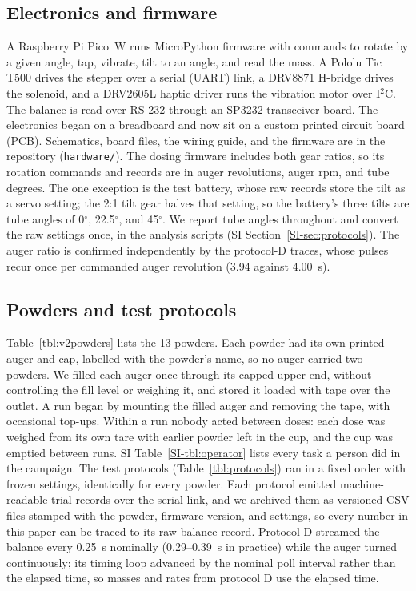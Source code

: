 \documentclass[twoside,twocolumn,9pt]{article}
\newcommand{\siref}[1]{\ref*{SI-#1}}
\begin{document}
\subsection{Electronics and firmware}
A Raspberry Pi Pico~W runs MicroPython firmware with commands to rotate by a given angle, tap, vibrate, tilt to an angle, and read the mass. A Pololu Tic T500 drives the stepper over a serial (UART) link, a DRV8871 H-bridge drives the solenoid, and a DRV2605L haptic driver runs the vibration motor over I$^2$C. The balance is read over RS-232 through an SP3232 transceiver board. The electronics began on a breadboard and now sit on a custom printed circuit board (PCB). Schematics, board files, the wiring guide, and the firmware are in the repository (\texttt{hardware/}). The dosing firmware includes both gear ratios, so its rotation commands and records are in auger revolutions, auger rpm, and tube degrees. The one exception is the test battery, whose raw records store the tilt as a servo setting; the 2:1 tilt gear halves that setting, so the battery's three tilts are tube angles of 0$^\circ$, 22.5$^\circ$, and 45$^\circ$. We report tube angles throughout and convert the raw settings once, in the analysis scripts (SI Section~\siref{sec:protocols}). The auger ratio is confirmed independently by the protocol-D traces, whose pulses recur once per commanded auger revolution (3.94 against 4.00~s).

\subsection{Powders and test protocols}
Table~\ref{tbl:v2powders} lists the 13 powders. Each powder had its own printed auger and cap, labelled with the powder's name, so no auger carried two powders. We filled each auger once through its capped upper end, without controlling the fill level or weighing it, and stored it loaded with tape over the outlet. A run began by mounting the filled auger and removing the tape, with occasional top-ups. Within a run nobody acted between doses: each dose was weighed from its own tare with earlier powder left in the cup, and the cup was emptied between runs. SI Table~\siref{tbl:operator} lists every task a person did in the campaign. The test protocols (Table~\ref{tbl:protocols}) ran in a fixed order with frozen settings, identically for every powder. Each protocol emitted machine-readable trial records over the serial link, and we archived them as versioned CSV files stamped with the powder, firmware version, and settings, so every number in this paper can be traced to its raw balance record. Protocol D streamed the balance every 0.25~s nominally (0.29--0.39~s in practice) while the auger turned continuously; its timing loop advanced by the nominal poll interval rather than the elapsed time, so masses and rates from protocol D use the elapsed time.
\end{document}

